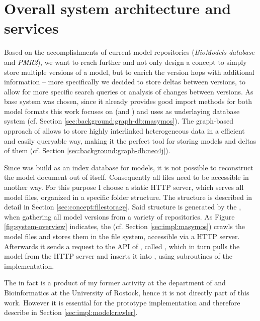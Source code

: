 \label{sec:concept}

\section{Overall system architecture and services}
\label{sec:concept:sysarchitecture}

Based on the accomplishments of current model repositories (\emph{BioModels database} and \emph{PMR2}), we want to reach further and not only design a concept to simply store multiple versions of a model, but to enrich the version hops with additional information -- more specifically we decided to store deltas between versions, to allow for more specific search queries or analysis of changes between versions.
As base system \masymos was chosen, since it already provides good import methods for both model formats this work focuses on (\sbml and \cellml) and uses \neoj as underlaying database system (cf. Section \ref{sec:background:graph-db:masymos}). The graph-based approach of \neoj allows to store highly interlinked heterogeneous data in a efficient and easily queryable way, making it the perfect tool for storing \sysbio models and deltas of them (cf. Section \ref{sec:background:graph-db:neo4j}).  

Since \masymos was build as an index database for models, it is not possible to reconstruct the \xml model document out of \masymos itself. Consequently all files need to be accessible in another way. For this purpose I choose a static HTTP server, which serves all model files, organized in a specific folder structure. The structure is described in detail in Section \ref{sec:concept:filestorage}.
Said structure is generated by the \modelcrawler, when gathering all model versions from a variety of repositories. As Figure \ref{fig:system-overview} indicates, the \modelcrawler (cf. Section \ref{sec:impl:masymos}) crawls the model files and stores them in the file system, accessible via a HTTP server. Afterwards it sends a request to the \rest API of \masymos, called \morre, which in turn pulls the model from the HTTP server and inserts it into \neoj, using subroutines of the \masymos implementation.

The \modelcrawler in fact is a product of my former activity at the department of \sysbio and Bioinformatics at the University of Rostock, hence it is not directly part of this work. However it is essential for the prototype implementation and therefore describe in Section \ref{sec:impl:modelcrawler}.

